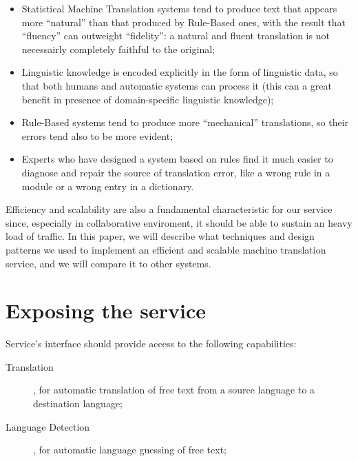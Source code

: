 \documentclass[11pt]{article}
\begin{document}
\begin{itemize}
 \item Statistical Machine Translation systems tend to produce text that appears more ``natural'' than that produced by Rule-Based ones, with
  the result that ``fluency'' can outweight ``fidelity'': a natural and fluent translation is not necessairly completely faithful to the original;
 \item Linguistic knowledge is encoded explicitly in the form of linguistic data, so that both humans and automatic systems can process 
  it (this can a great benefit in presence of domain-specific linguistic knowledge);
 \item Rule-Based systems tend to produce more ``mechanical'' translations, so their errors tend also to be more evident;
 \item Experts who have designed a system based on rules find it much easier to diagnose and repair the source of translation error, like
  a wrong rule in a module or a wrong entry in a dictionary.
\end{itemize}

Efficiency and scalability are also a fundamental characteristic for our service since, especially in collaborative enviroment, it should be able
to sustain an heavy load of traffic. In this paper, we will describe what techniques and design patterns we used to implement an efficient and
scalable machine translation service, and we will compare it to other systems.


\section{Exposing the service}

Service's interface should provide access to the following capabilities:

\begin{description}
  \item[Translation], for automatic translation of free text from a source language to a destination language;
  \item[Language Detection], for automatic language guessing of free text;
\end{description}
\end{document}
